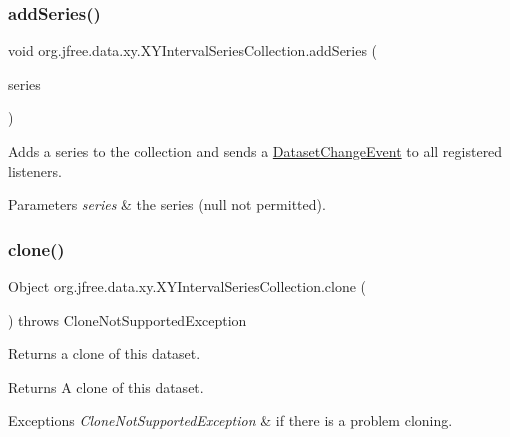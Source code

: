 \subsubsection{\texorpdfstring{add\+Series()}{addSeries()}}
{\footnotesize\ttfamily void org.\+jfree.\+data.\+xy.\+X\+Y\+Interval\+Series\+Collection.\+add\+Series (\begin{DoxyParamCaption}\item[{\mbox{\hyperlink{classorg_1_1jfree_1_1data_1_1xy_1_1_x_y_interval_series}{X\+Y\+Interval\+Series}}}]{series }\end{DoxyParamCaption})}

Adds a series to the collection and sends a \mbox{\hyperlink{}{Dataset\+Change\+Event}} to all registered listeners.


\begin{DoxyParams}{Parameters}
{\em series} & the series ({\ttfamily null} not permitted). \\
\hline
\end{DoxyParams}
\mbox{\label{classorg_1_1jfree_1_1data_1_1xy_1_1_x_y_interval_series_collection_a0924e8d892ccbe49756b0351e259425c}} 
\subsubsection{\texorpdfstring{clone()}{clone()}}
{\footnotesize\ttfamily Object org.\+jfree.\+data.\+xy.\+X\+Y\+Interval\+Series\+Collection.\+clone (\begin{DoxyParamCaption}{ }\end{DoxyParamCaption}) throws Clone\+Not\+Supported\+Exception}

Returns a clone of this dataset.

\begin{DoxyReturn}{Returns}
A clone of this dataset.
\end{DoxyReturn}

\begin{DoxyExceptions}{Exceptions}
{\em Clone\+Not\+Supported\+Exception} & if there is a problem cloning. \\
\hline
\end{DoxyExceptions}
\mbox{\label{classorg_1_1jfree_1_1data_1_1xy_1_1_x_y_interval_series_collection_aa03f5e3cdf1e57c8494677da68572357}} 
